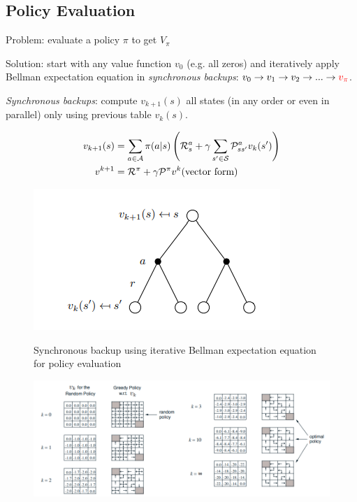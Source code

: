 \subsection{Policy Evaluation}
Problem: evaluate a policy $\pi$ to get $V_\pi$

Solution: start with any value function $v_0$ (e.g. all zeros) and iteratively apply Bellman expectation equation in \textit{synchronous backups}: $v_0 \to v_1 \to v_2 \to ... \to \textcolor{red}{v_\pi}$.

\textit{Synchronous backups}: compute $v_{k+1}(s)$ all states (in any order or even in parallel) only using previous table $v_{k}(s)$.


\begin{figure}[ht]
	\begin{minipage}{0.5\textwidth} %
\begin{align*}
	v_{k+1}(s) &= \sum_{a\in \mathcal{A}}  \pi(a|s) \left(\mathcal{R}_s^a + \gamma \sum_{s' \in \mathcal{S}} \mathcal{P}_{s s'}^a v_{k}(s')\right) \\
	v^{k+1} &= \mathcal{R}^\pi + \gamma \mathcal{P}^{\pi} v^k  \text{(vector form)} \notag	
\end{align*}
	\end{minipage}%
	\begin{minipage}{0.5\textwidth} %
	\centering
\includegraphics[width=0.6\linewidth]{img/dynprog_eval_sync_backup_tree}
\label{fig:dynprogevalsyncbackuptree}
	\end{minipage}
\caption{Synchronous backup using iterative Bellman expectation equation for policy evaluation}
\end{figure}


\begin{figure}[h]
	\centering
	\includegraphics[width=1\linewidth]{img/dynprog_evaluation_random_policy}
	\caption{}
	\label{fig:dynprogevaluationrandompolicy}
\end{figure}


